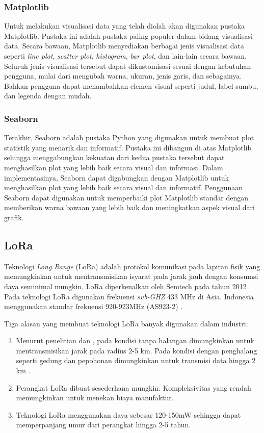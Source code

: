 \subsubsection{Matplotlib}
Untuk melakukan visualisasi data yang telah diolah akan digunakan pustaka Matplotlib. Pustaka ini adalah pustaka paling populer dalam bidang visualisasi data. Secara bawaan, Matplotlib menyediakan berbagai jenis visualisasi data seperti \textit{line plot}, \textit{scatter plot}, \textit{histogram}, \textit{bar plot}, dan lain-lain secara bawaan. Seluruh jenis visualisasi tersebut dapat dikustomisasi sesuai dengan kebutuhan pengguna, mulai dari mengubah warna, ukuran, jenis garis, dan sebagainya. Bahkan pengguna dapat menambahkan elemen visual seperti judul, label sumbu, dan legenda dengan mudah.

\subsubsection{Seaborn}
Terakhir, Seaborn adalah pustaka Python yang digunakan untuk membuat plot statistik yang menarik dan informatif. Pustaka ini dibangun di atas Matplotlib sehingga menggabungkan kekuatan dari kedua pustaka tersebut dapat menghasilkan plot yang lebih baik secara visual dan informasi. Dalam implementasinya, Seaborn dapat digabungkan dengan Matplotlib untuk menghasilkan plot yang lebih baik secara visual dan informatif. Penggunaan Seaborn dapat digunakan untuk memperbaiki plot Matplotlib standar dengan memberikan warna bawaan yang lebih baik dan meningkatkan aspek visual dari grafik.

\iffalse
\subsection{LoRa}
Teknologi \textit{Long Range} (LoRa) adalah protokol komunikasi pada lapiran fisik yang memungkinkan untuk mentransmisikan isyarat pada jarak jauh dengan konsumsi daya seminimal mungkin. LoRa diperkenalkan oleh Semtech pada tahun 2012 \cite{Oliveira2017}. Pada teknologi LoRa digunakan frekuensi \textit{sub-GHZ} 433 MHz di Asia. Indonesia menggunakan standar frekuensi 920-923MHz (AS923-2) \cite{LoRa2020}.

Tiga alasan yang membuat teknologi LoRa banyak digunakan dalam industri:

\begin{enumerate}
	\item Menurut penelitian \cite{Petajajarvi2016} dan \cite{Haxhibeqiri2017}, pada kondisi tanpa halangan dimungkinkan untuk mentransmisikan jarak pada radius 2-5 km. Pada kondisi dengan penghalang seperti gedung dan pepohonan dimungkinkan untuk transmisi data hingga 2 km \cite{Rida2019}.
	\item Perangkat LoRa dibuat sesederhana mungkin. Kompleksivitas yang rendah memungkinkan untuk menekan biaya manufaktur.
	\item Teknologi LoRa menggunakan daya sebesar 120-150mW sehingga dapat memperpanjang umur dari perangkat hingga 2-5 tahun.
\end{enumerate}

